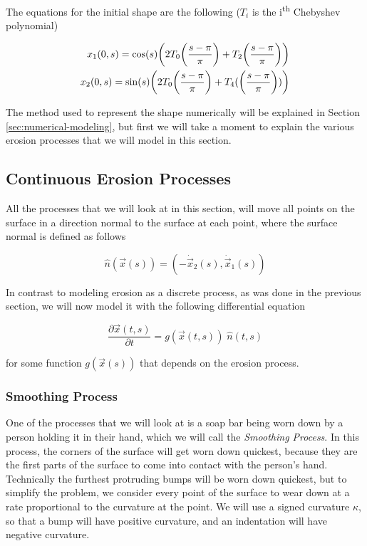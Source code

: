 The equations for the initial shape are the following ($T_i$ is the i\textsuperscript{th} Chebyshev polynomial)

\begin{align*}
  x_1(0, s) = \cos(s) \paren{2 T_0\paren{\frac{s-\pi}{\pi}} + T_2\paren{\frac{s-\pi}{\pi}}}\\
  x_2(0, s) = \sin(s) \paren{2 T_0\paren{\frac{s-\pi}{\pi}} + T_4(\paren{\frac{s-\pi}{\pi}})}
\end{align*}

The method used to represent the shape numerically will be explained in Section \ref{sec:numerical-modeling}, but first we will take a moment to explain the various erosion processes that we will model in this section.

\subsection*{Continuous Erosion Processes}

All the processes that we will look at in this section, will move all points on the surface in a direction normal to the surface at each point, where the surface normal is defined as follows

\[
  \hat{n}(\vec{x}(s)) = (-\dot{\vec{x}}_2(s), \dot{\vec{x}}_1(s))
\]

In contrast to modeling erosion as a discrete process, as was done in the previous section, we will now model it with the following differential equation

\begin{equation}
  \frac{\partial \vec{x}(t, s)}{\partial t} = g(\vec{x}(t, s)) \; \hat{n}(t, s) \label{eq:erosion-diff-eq}
\end{equation}

for some function $g(\vec{x}(s))$ that depends on the erosion process.

\subsubsection*{Smoothing Process}

One of the processes that we will look at is a soap bar being worn down by a person holding it in their hand, which we will call the \textit{Smoothing Process}. In this process, the corners of the surface will get worn down quickest, because they are the first parts of the surface to come into contact with the person's hand. Technically the furthest protruding bumps will be worn down quickest, but to simplify the problem, we consider every point of the surface to wear down at a rate proportional to the curvature at the point. We will use a signed curvature $\kappa$, so that a bump will have positive curvature, and an indentation will have negative curvature. 

